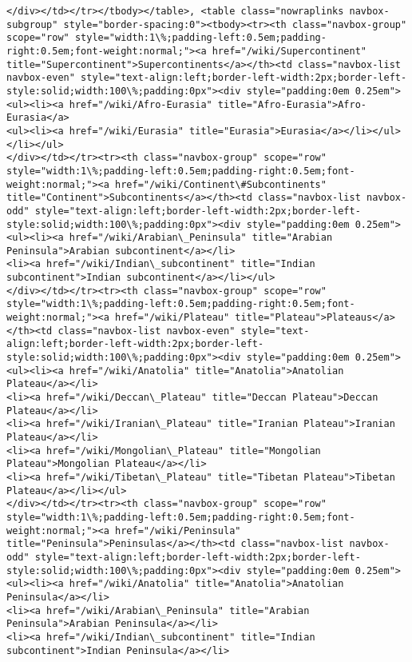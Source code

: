 \documentclass[11pt]{article}
\begin{document}
\begin{Verbatim}[commandchars=\\\{\}]
</div></td></tr></tbody></table>, <table class="nowraplinks navbox-subgroup" style="border-spacing:0"><tbody><tr><th class="navbox-group" scope="row" style="width:1\%;padding-left:0.5em;padding-right:0.5em;font-weight:normal;"><a href="/wiki/Supercontinent" title="Supercontinent">Supercontinents</a></th><td class="navbox-list navbox-even" style="text-align:left;border-left-width:2px;border-left-style:solid;width:100\%;padding:0px"><div style="padding:0em 0.25em">
<ul><li><a href="/wiki/Afro-Eurasia" title="Afro-Eurasia">Afro-Eurasia</a>
<ul><li><a href="/wiki/Eurasia" title="Eurasia">Eurasia</a></li></ul></li></ul>
</div></td></tr><tr><th class="navbox-group" scope="row" style="width:1\%;padding-left:0.5em;padding-right:0.5em;font-weight:normal;"><a href="/wiki/Continent\#Subcontinents" title="Continent">Subcontinents</a></th><td class="navbox-list navbox-odd" style="text-align:left;border-left-width:2px;border-left-style:solid;width:100\%;padding:0px"><div style="padding:0em 0.25em">
<ul><li><a href="/wiki/Arabian\_Peninsula" title="Arabian Peninsula">Arabian subcontinent</a></li>
<li><a href="/wiki/Indian\_subcontinent" title="Indian subcontinent">Indian subcontinent</a></li></ul>
</div></td></tr><tr><th class="navbox-group" scope="row" style="width:1\%;padding-left:0.5em;padding-right:0.5em;font-weight:normal;"><a href="/wiki/Plateau" title="Plateau">Plateaus</a></th><td class="navbox-list navbox-even" style="text-align:left;border-left-width:2px;border-left-style:solid;width:100\%;padding:0px"><div style="padding:0em 0.25em">
<ul><li><a href="/wiki/Anatolia" title="Anatolia">Anatolian Plateau</a></li>
<li><a href="/wiki/Deccan\_Plateau" title="Deccan Plateau">Deccan Plateau</a></li>
<li><a href="/wiki/Iranian\_Plateau" title="Iranian Plateau">Iranian Plateau</a></li>
<li><a href="/wiki/Mongolian\_Plateau" title="Mongolian Plateau">Mongolian Plateau</a></li>
<li><a href="/wiki/Tibetan\_Plateau" title="Tibetan Plateau">Tibetan Plateau</a></li></ul>
</div></td></tr><tr><th class="navbox-group" scope="row" style="width:1\%;padding-left:0.5em;padding-right:0.5em;font-weight:normal;"><a href="/wiki/Peninsula" title="Peninsula">Peninsulas</a></th><td class="navbox-list navbox-odd" style="text-align:left;border-left-width:2px;border-left-style:solid;width:100\%;padding:0px"><div style="padding:0em 0.25em">
<ul><li><a href="/wiki/Anatolia" title="Anatolia">Anatolian Peninsula</a></li>
<li><a href="/wiki/Arabian\_Peninsula" title="Arabian Peninsula">Arabian Peninsula</a></li>
<li><a href="/wiki/Indian\_subcontinent" title="Indian subcontinent">Indian Peninsula</a></li>

\end{Verbatim}
\end{document}

